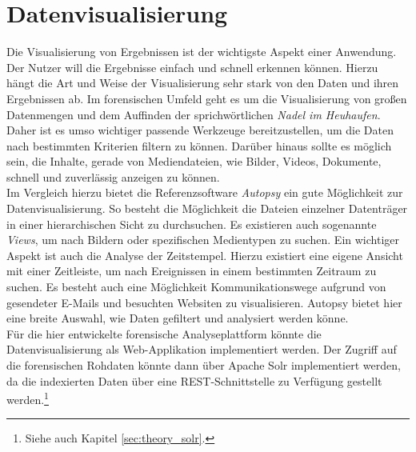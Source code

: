 \chapter{Datenvisualisierung}
\label{ch:data_visualization}

Die Visualisierung von Ergebnissen ist der wichtigste Aspekt einer Anwendung. Der Nutzer will die Ergebnisse einfach und schnell erkennen können. Hierzu hängt die Art und Weise der Visualisierung sehr stark von den Daten und ihren Ergebnissen ab. Im forensischen Umfeld geht es um die Visualisierung von großen Datenmengen und dem Auffinden der sprichwörtlichen \textit{Nadel im Heuhaufen}. Daher ist es umso wichtiger passende Werkzeuge bereitzustellen, um die Daten nach bestimmten Kriterien filtern zu können. Darüber hinaus sollte es möglich sein, die Inhalte, gerade von Mediendateien, wie Bilder, Videos, Dokumente, schnell und zuverlässig anzeigen zu können.\\

\noindent
Im Vergleich hierzu bietet die Referenzsoftware \textit{Autopsy} ein gute Möglichkeit zur Datenvisualisierung. So besteht die Möglichkeit die Dateien einzelner Datenträger in einer hierarchischen Sicht zu durchsuchen. Es existieren auch sogenannte \textit{Views}, um nach Bildern oder spezifischen Medientypen zu suchen. Ein wichtiger Aspekt ist auch die Analyse der Zeitstempel. Hierzu existiert eine eigene Ansicht mit einer Zeitleiste, um nach Ereignissen in einem bestimmten Zeitraum zu suchen. Es besteht auch eine Möglichkeit Kommunikationswege aufgrund von gesendeter E-Mails und besuchten Websiten zu visualisieren. Autopsy bietet hier eine breite Auswahl, wie Daten gefiltert und analysiert werden könne.\\

\noindent
Für die hier entwickelte forensische Analyseplattform könnte die Datenvisualisierung als Web-Applikation implementiert werden. Der Zugriff auf die forensischen Rohdaten könnte dann über Apache Solr implementiert werden, da die indexierten Daten über eine REST-Schnittstelle zu Verfügung gestellt werden.\footnote{Siehe auch Kapitel \ref{sec:theory_solr}.}


